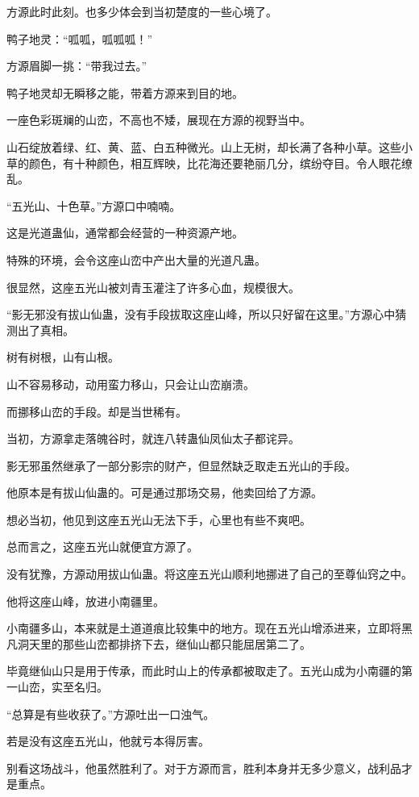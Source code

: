 \begin{this_body}
方源此时此刻。也多少体会到当初楚度的一些心境了。

鸭子地灵：“呱呱，呱呱呱！”

方源眉脚一挑：“带我过去。”

鸭子地灵却无瞬移之能，带着方源来到目的地。

一座色彩斑斓的山峦，不高也不矮，展现在方源的视野当中。

山石绽放着绿、红、黄、蓝、白五种微光。山上无树，却长满了各种小草。这些小草的颜色，有十种颜色，相互辉映，比花海还要艳丽几分，缤纷夺目。令人眼花缭乱。

“五光山、十色草。”方源口中喃喃。

这是光道蛊仙，通常都会经营的一种资源产地。

特殊的环境，会令这座山峦中产出大量的光道凡蛊。

很显然，这座五光山被刘青玉灌注了许多心血，规模很大。

“影无邪没有拔山仙蛊，没有手段拔取这座山峰，所以只好留在这里。”方源心中猜测出了真相。

树有树根，山有山根。

山不容易移动，动用蛮力移山，只会让山峦崩溃。

而挪移山峦的手段。却是当世稀有。

当初，方源拿走落魄谷时，就连八转蛊仙凤仙太子都诧异。

影无邪虽然继承了一部分影宗的财产，但显然缺乏取走五光山的手段。

他原本是有拔山仙蛊的。可是通过那场交易，他卖回给了方源。

想必当初，他见到这座五光山无法下手，心里也有些不爽吧。

总而言之，这座五光山就便宜方源了。

没有犹豫，方源动用拔山仙蛊。将这座五光山顺利地挪进了自己的至尊仙窍之中。

他将这座山峰，放进小南疆里。

小南疆多山，本来就是土道道痕比较集中的地方。现在五光山增添进来，立即将黑凡洞天里的那些山峦都排挤下去，继仙山都只能屈居第二了。

毕竟继仙山只是用于传承，而此时山上的传承都被取走了。五光山成为小南疆的第一山峦，实至名归。

“总算是有些收获了。”方源吐出一口浊气。

若是没有这座五光山，他就亏本得厉害。

别看这场战斗，他虽然胜利了。对于方源而言，胜利本身并无多少意义，战利品才是重点。


\end{this_body}

